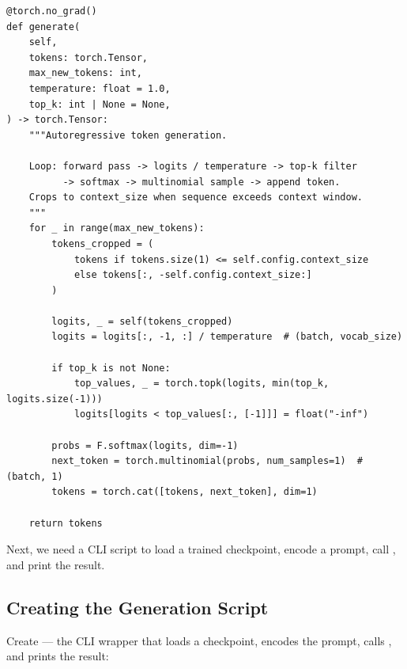 \begin{lstlisting}
@torch.no_grad()
def generate(
    self,
    tokens: torch.Tensor,
    max_new_tokens: int,
    temperature: float = 1.0,
    top_k: int | None = None,
) -> torch.Tensor:
    """Autoregressive token generation.

    Loop: forward pass -> logits / temperature -> top-k filter
          -> softmax -> multinomial sample -> append token.
    Crops to context_size when sequence exceeds context window.
    """
    for _ in range(max_new_tokens):
        tokens_cropped = (
            tokens if tokens.size(1) <= self.config.context_size
            else tokens[:, -self.config.context_size:]
        )

        logits, _ = self(tokens_cropped)
        logits = logits[:, -1, :] / temperature  # (batch, vocab_size)

        if top_k is not None:
            top_values, _ = torch.topk(logits, min(top_k, logits.size(-1)))
            logits[logits < top_values[:, [-1]]] = float("-inf")

        probs = F.softmax(logits, dim=-1)
        next_token = torch.multinomial(probs, num_samples=1)  # (batch, 1)
        tokens = torch.cat([tokens, next_token], dim=1)

    return tokens
\end{lstlisting}

Next, we need a CLI script to load a trained checkpoint, encode a prompt, call , and print the result.

\subsection{Creating the Generation Script}

Create  --- the CLI wrapper that loads a checkpoint, encodes the prompt, calls , and prints the result:

